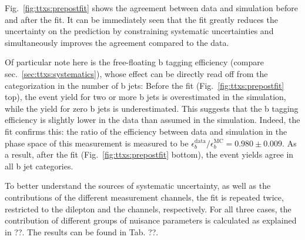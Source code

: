 Fig.~\ref{fig:ttxs:prepostfit} shows the agreement between data and simulation before and after the fit. It can be immediately seen that the fit greatly reduces the uncertainty on the prediction by constraining systematic uncertainties and simultaneously improves the agreement compared to the data. 

Of particular note here is the free-floating b tagging efficiency (compare sec.~\ref{sec:ttxs:systematics}), whose effect can be directly read off from the categorization in the number of b jets: Before the fit (Fig.~\ref{fig:ttxs:prepostfit} top), the event yield for two or more b jets is overestimated in the simulation, while the yield for zero b jets is underestimated. This suggests that the b tagging efficiency is slightly lower in the data than assumed in the simulation. Indeed, the fit confirms this: the ratio of the efficiency between data and simulation in the phase space of this measurement is measured to be $\epsilon_b^{\mathrm{data}}/\epsilon_b^{\mathrm{MC}} = 0.980 \pm 0.009$. As a result, after the fit (Fig.~\ref{fig:ttxs:prepostfit} bottom), the event yields agree in all b jet categories.

To better understand the sources of systematic uncertainty, as well as the contributions of the different measurement channels, the fit is repeated twice, restricted to the dilepton and the \ljets channels, respectively. For all three cases, the contribution of different groups of nuisance parameters is calculated as explained in ??. The results can be found in Tab. ??.

